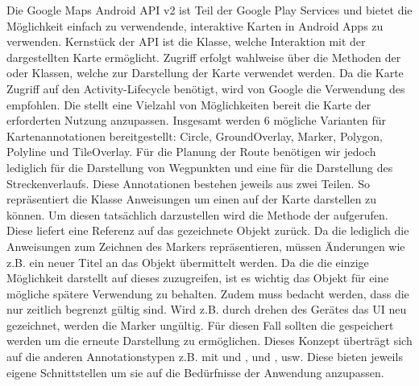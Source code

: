 \label{par:GoogleMapsAndroidAPI}
Die Google Maps Android API v2 ist Teil der Google Play Services und bietet die Möglichkeit einfach zu verwendende, interaktive Karten in Android Apps zu verwenden. Kernstück der API ist die  Klasse, welche Interaktion mit der dargestellten Karte ermöglicht. Zugriff erfolgt wahlweise über die  Methoden der  oder  Klassen, welche zur Darstellung der Karte verwendet werden. Da die Karte Zugriff auf den Activity-Lifecycle benötigt, wird von Google die Verwendung des  empfohlen. Die  stellt eine Vielzahl von Möglichkeiten bereit die Karte der erforderten Nutzung anzupassen. Insgesamt werden 6 mögliche Varianten für Kartenannotationen bereitgestellt: Circle, GroundOverlay, Marker, Polygon, Polyline und TileOverlay. Für die Planung der Route benötigen wir jedoch lediglich  für die Darstellung von Wegpunkten und eine  für die Darstellung des Streckenverlaufs. Diese Annotationen bestehen jeweils aus zwei Teilen. So repräsentiert die  Klasse Anweisungen um einen  auf der Karte darstellen zu können. Um diesen tatsächlich darzustellen wird die  Methode der  aufgerufen. Diese liefert eine Referenz auf das gezeichnete  Objekt zurück. Da die  lediglich die Anweisungen zum Zeichnen des Markers repräsentieren, müssen Änderungen wie z.B. ein neuer Titel an das  Objekt übermittelt werden. Da die  die einzige Möglichkeit darstellt auf dieses zuzugreifen, ist es wichtig das Objekt für eine mögliche spätere Verwendung zu behalten. Zudem muss bedacht werden, dass die  nur zeitlich begrenzt gültig sind. Wird z.B. durch drehen des Gerätes das UI neu gezeichnet, werden die Marker ungültig. Für diesen Fall sollten die  gespeichert werden um die erneute Darstellung zu ermöglichen. Dieses Konzept überträgt sich auf die anderen Annotationstypen z.B. mit  und ,  und , usw. Diese bieten jeweils eigene Schnittstellen um sie auf die Bedürfnisse der Anwendung anzupassen.

